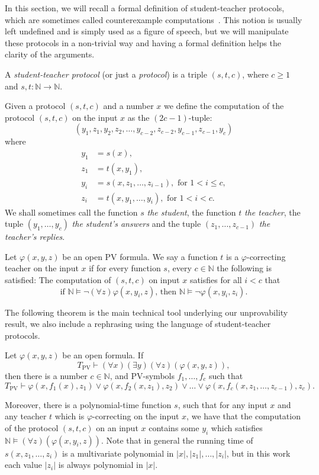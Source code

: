 \documentclass{lmcs}
\newcommand{\PV}{\text{PV}}
\newcommand{\abs}[1]{\lvert #1\rvert}
\newcommand{\NN}{\mathbb{N}}
\begin{document}
In this section, we will recall a formal definition of student-teacher protocols, which are sometimes called counterexample computations~\cite{krajivcek1992no}. This notion is usually left undefined and is simply used as a figure of speech, but we will manipulate these protocols in a non-trivial way and having a formal definition helps the clarity of the arguments.

\begin{defi}
    A \emph{student-teacher protocol} (or just a \emph{protocol}) is a triple $(s,t,c)$, where $c\geq 1$ and $s,t:\NN\to \NN$. 

    Given a protocol $(s,t,c)$ and a number $x$ we define the computation of the protocol $(s,t,c)$ on the input $x$ as the $(2c-1)$-tuple:
    \[(y_1,z_1,y_2, z_2, \dots, y_{c-2},z_{c-2},y_{c-1},z_{c-1},y_c)\]
    where 
    \begin{align*}
        y_1 &= s(x),\\
        z_1 &= t(x,y_1), \\
        y_i &= s(x,z_1,\dots,z_{i-1}), \text{ for }1<i\leq c,\\
        z_i &= t(x,y_1,\dots, y_{i}), \text{ for }1<i<c.
    \end{align*}
    We shall sometimes call the function $s$ \emph{the student}, the function $t$ \emph{the teacher}, the tuple $(y_1,\dots, y_c)$ \emph{the student's answers} and the tuple $(z_1,\dots, z_{c-1})$ \emph{the teacher's replies}.
\end{defi}

\begin{defi}
    Let $\varphi(x,y,z)$ be an open $\PV$ formula. We say a function $t$ is a $\varphi$-correcting teacher on the input $x$ if for every function $s$, every $c\in \NN$ the following is satisfied: The computation of $(s,t,c)$ on input $x$ satisfies for all $i<c$ that \[\text{if }\NN \models \lnot (\forall z)\varphi(x,y_i,z)\text{, then }\NN \models \lnot\varphi(x,y_i,z_i).\]
\end{defi}

The following theorem is the main technical tool underlying our unprovability result, we also include a rephrasing using the language of student-teacher protocols.

\begin{thm}\label{thrmkpt}
    Let $\varphi(x,y,z)$ be an open formula. If
    \[T_{\PV} \vdash (\forall x)(\exists y)(\forall z)(\varphi(x,y,z)),\]
    then there is a number $c\in\NN$, and $\PV$-symbols $f_1,\dots,f_c$ such that
    \[T_{\PV} \vdash \varphi(x,f_1(x),z_1) \lor \varphi(x,f_2(x,z_1),z_2) \lor \dots \lor \varphi(x,f_c(x,z_1,\dots,z_{c-1}),z_c).\]

    Moreover, there is a polynomial-time function $s$, such that for any input $x$ and any teacher $t$ which is $\varphi$-correcting on the input $x$, we have that the computation of the protocol $(s,t,c)$ on an input $x$ contains some $y_i$ which satisfies $\NN \models (\forall z)(\varphi(x,y_i,z))$. Note that in general the running time of $s(x,z_1,\dots,z_i)$ is a multivariate polynomial in $\abs{x}, \abs{z_1},\dots,\abs{z_i}$, but in this work each value $\abs{z_i}$ is always polynomial in $\abs{x}$.
\end{thm}
\end{document}
